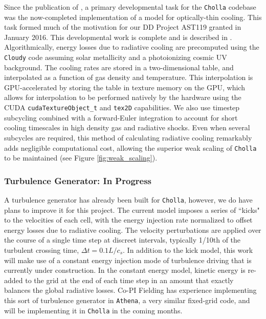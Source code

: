 \documentclass[11pt,letterpaper,english]{article}
\begin{document}
Since the publication of \cite{Schneider15}, a primary developmental task for the {\tt Cholla} codebase was
 the now-completed implementation of a model for optically-thin cooling. This task formed much of the motivation for
our DD Project AST119 granted in January 2016. This developmental work is complete and is
described in \cite{Schneider17}. Algorithmically, energy losses due to radiative cooling are precomputed using the
{\tt Cloudy} code \cite{Ferland13} assuming solar metallicity and a photoionizing
cosmic UV background. The cooling rates are stored in a two-dimensional table,
and interpolated as a function of gas density and temperature. This interpolation 
is GPU-accelerated by storing the table in texture memory on the GPU, which allows
for interpolation to be performed natively by the hardware using the CUDA {\tt cudaTextureObject\_t} and {\tt tex2D} capabilities.
We also use timestep subcycling combined with a forward-Euler integration to account for short cooling timescales in high density gas and radiative shocks. Even when several subcycles are required, this method of calculating radiative cooling remarkably adds negligible computational cost, allowing the superior
weak scaling of {\tt Cholla} to be maintained (see Figure \ref{fig:weak_scaling}).

\vspace{-.2in}
\subsubsection{Turbulence Generator: In Progress}
\vspace{-.25in}

A turbulence generator has already been built for {\tt Cholla}, however, we do have plans to improve it for this project. The current model imposes a series of ``kicks" to the velocities of each cell, with the energy injection rate normalized to offset energy losses due to radiative cooling. The velocity perturbations are applied over the course of a single time step at discreet intervals, typically 1/10th of the turbulent crossing time, $\Delta t = 0.1 L / c_s$. In addition to the kick model, this work will make use of a constant energy injection mode of turbulence driving that is currently under construction. In the constant energy model, kinetic energy is re-added to the grid at the end of each time step in an amount that exactly balances the global radiative losses. Co-PI Fielding has experience implementing this sort of turbulence generator in {\tt Athena}, a very similar fixed-grid code, and will be implementing it in {\tt Cholla} in the coming months.
\end{document}
